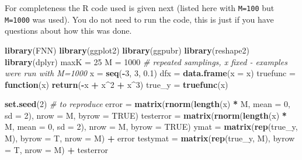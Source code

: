 \documentclass[ignorenonframetext,]{beamer}
\newenvironment{Shaded}{\begin{snugshade}}{\end{snugshade}}
\newcommand{\KeywordTok}[1]{\textcolor[rgb]{0.13,0.29,0.53}{\textbf{#1}}}
\newcommand{\DataTypeTok}[1]{\textcolor[rgb]{0.13,0.29,0.53}{#1}}
\newcommand{\DecValTok}[1]{\textcolor[rgb]{0.00,0.00,0.81}{#1}}
\newcommand{\FloatTok}[1]{\textcolor[rgb]{0.00,0.00,0.81}{#1}}
\newcommand{\StringTok}[1]{\textcolor[rgb]{0.31,0.60,0.02}{#1}}
\newcommand{\CommentTok}[1]{\textcolor[rgb]{0.56,0.35,0.01}{\textit{#1}}}
\newcommand{\OtherTok}[1]{\textcolor[rgb]{0.56,0.35,0.01}{#1}}
\newcommand{\ControlFlowTok}[1]{\textcolor[rgb]{0.13,0.29,0.53}{\textbf{#1}}}
\newcommand{\OperatorTok}[1]{\textcolor[rgb]{0.81,0.36,0.00}{\textbf{#1}}}
\newcommand{\NormalTok}[1]{#1}
\begin{document}
\begin{frame}[fragile]

For completeness the R code used is given next (listed here with
\texttt{M=100} but \texttt{M=1000} was used). You do not need to run the
code, this is just if you have questions about how this was done.

\footnotesize

\begin{Shaded}
\begin{Highlighting}[]
\KeywordTok{library}\NormalTok{(FNN)}
\KeywordTok{library}\NormalTok{(ggplot2)}
\KeywordTok{library}\NormalTok{(ggpubr)}
\KeywordTok{library}\NormalTok{(reshape2)}
\KeywordTok{library}\NormalTok{(dplyr)}
\NormalTok{maxK =}\StringTok{ }\DecValTok{25}
\NormalTok{M =}\StringTok{ }\DecValTok{1000}  \CommentTok{# repeated samplings, x fixed  - examples were run with M=1000}
\NormalTok{x =}\StringTok{ }\KeywordTok{seq}\NormalTok{(}\OperatorTok{-}\DecValTok{3}\NormalTok{, }\DecValTok{3}\NormalTok{, }\FloatTok{0.1}\NormalTok{)}
\NormalTok{dfx =}\StringTok{ }\KeywordTok{data.frame}\NormalTok{(}\DataTypeTok{x =}\NormalTok{ x)}
\NormalTok{truefunc =}\StringTok{ }\ControlFlowTok{function}\NormalTok{(x) }\KeywordTok{return}\NormalTok{(}\OperatorTok{-}\NormalTok{x }\OperatorTok{+}\StringTok{ }\NormalTok{x}\OperatorTok{^}\DecValTok{2} \OperatorTok{+}\StringTok{ }\NormalTok{x}\OperatorTok{^}\DecValTok{3}\NormalTok{)}
\NormalTok{true_y =}\StringTok{ }\KeywordTok{truefunc}\NormalTok{(x)}

\KeywordTok{set.seed}\NormalTok{(}\DecValTok{2}\NormalTok{)  }\CommentTok{# to reproduce}
\NormalTok{error =}\StringTok{ }\KeywordTok{matrix}\NormalTok{(}\KeywordTok{rnorm}\NormalTok{(}\KeywordTok{length}\NormalTok{(x) }\OperatorTok{*}\StringTok{ }\NormalTok{M, }\DataTypeTok{mean =} \DecValTok{0}\NormalTok{, }\DataTypeTok{sd =} \DecValTok{2}\NormalTok{), }\DataTypeTok{nrow =}\NormalTok{ M, }\DataTypeTok{byrow =} \OtherTok{TRUE}\NormalTok{)}
\NormalTok{testerror =}\StringTok{ }\KeywordTok{matrix}\NormalTok{(}\KeywordTok{rnorm}\NormalTok{(}\KeywordTok{length}\NormalTok{(x) }\OperatorTok{*}\StringTok{ }\NormalTok{M, }\DataTypeTok{mean =} \DecValTok{0}\NormalTok{, }\DataTypeTok{sd =} \DecValTok{2}\NormalTok{), }\DataTypeTok{nrow =}\NormalTok{ M, }
    \DataTypeTok{byrow =} \OtherTok{TRUE}\NormalTok{)}
\NormalTok{ymat =}\StringTok{ }\KeywordTok{matrix}\NormalTok{(}\KeywordTok{rep}\NormalTok{(true_y, M), }\DataTypeTok{byrow =}\NormalTok{ T, }\DataTypeTok{nrow =}\NormalTok{ M) }\OperatorTok{+}\StringTok{ }\NormalTok{error}
\NormalTok{testymat =}\StringTok{ }\KeywordTok{matrix}\NormalTok{(}\KeywordTok{rep}\NormalTok{(true_y, M), }\DataTypeTok{byrow =}\NormalTok{ T, }\DataTypeTok{nrow =}\NormalTok{ M) }\OperatorTok{+}\StringTok{ }\NormalTok{testerror}


\end{Highlighting}
\end{Shaded}
\end{frame}
\end{document}
